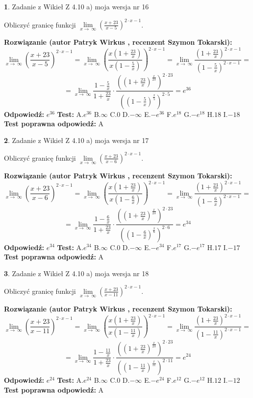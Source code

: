 \documentclass[12pt, a4paper]{article}
\theoremstyle{definition} %
\newtheorem{zad}{}
\newcommand{\zadStart}[1]{\begin{zad}#1\newline}
\newcommand{\zadStop}{\end{zad}}
\newcommand{\rozwStart}[2]{\noindent \textbf{Rozwiązanie (autor #1 , recenzent #2): }\newline}
\newcommand{\rozwStop}{\newline}
\newcommand{\odpStart}{\noindent \textbf{Odpowiedź:}\newline}
\newcommand{\odpStop}{\newline}
\newcommand{\testStart}{\noindent \textbf{Test:}\newline}
\newcommand{\testStop}{\newline}
\newcommand{\kluczStart}{\noindent \textbf{Test poprawna odpowiedź:}\newline}
\newcommand{\kluczStop}{\newline}
\begin{document}
\zadStart{Zadanie z Wikieł Z 4.10 a) moja wersja nr 16}

Obliczyć granicę funkcji  $\lim\limits_{x\to\ \infty}(\frac{x+23}{x-5})^{2\cdot x-1}$.
\zadStop
\rozwStart{Patryk Wirkus}{Szymon Tokarski}
$$\lim\limits_{x\to\ \infty}(\frac{x+23}{x-5})^{2\cdot x-1} = \lim\limits_{x\to\ \infty}(\frac{x(1+\frac{23}{x})}{x(1-\frac{5}{x})})^{2\cdot x-1}=\lim\limits_{x\to\ \infty}\frac{(1+\frac{23}{x})^{2\cdot x-1}}{(1-\frac{5}{x})^{2\cdot x-1}}=$$
$$=\lim\limits_{x\to\ \infty}\frac{1-\frac{5}{x}}{1+\frac{23}{x}}\cdot\frac{((1+\frac{23}{x})^{\frac{x}{23}})^{2\cdot23}}{((1-\frac{5}{x})^{\frac{x}{5}})^{2\cdot5}}=e^{36}$$
\rozwStop
\odpStart
$e^{36}$
\odpStop
\testStart
A.$e^{36}$ B.$\infty$ C.$0$ D.$-\infty$ E.$-e^{36}$
F.$e^{18}$ G.$-e^{18}$
H.$18$
I.$-18$
\testStop
\kluczStart
A
\kluczStop



\zadStart{Zadanie z Wikieł Z 4.10 a) moja wersja nr 17}

Obliczyć granicę funkcji  $\lim\limits_{x\to\ \infty}(\frac{x+23}{x-6})^{2\cdot x-1}$.
\zadStop
\rozwStart{Patryk Wirkus}{Szymon Tokarski}
$$\lim\limits_{x\to\ \infty}(\frac{x+23}{x-6})^{2\cdot x-1} = \lim\limits_{x\to\ \infty}(\frac{x(1+\frac{23}{x})}{x(1-\frac{6}{x})})^{2\cdot x-1}=\lim\limits_{x\to\ \infty}\frac{(1+\frac{23}{x})^{2\cdot x-1}}{(1-\frac{6}{x})^{2\cdot x-1}}=$$
$$=\lim\limits_{x\to\ \infty}\frac{1-\frac{6}{x}}{1+\frac{23}{x}}\cdot\frac{((1+\frac{23}{x})^{\frac{x}{23}})^{2\cdot23}}{((1-\frac{6}{x})^{\frac{x}{6}})^{2\cdot6}}=e^{34}$$
\rozwStop
\odpStart
$e^{34}$
\odpStop
\testStart
A.$e^{34}$ B.$\infty$ C.$0$ D.$-\infty$ E.$-e^{34}$
F.$e^{17}$ G.$-e^{17}$
H.$17$
I.$-17$
\testStop
\kluczStart
A
\kluczStop



\zadStart{Zadanie z Wikieł Z 4.10 a) moja wersja nr 18}

Obliczyć granicę funkcji  $\lim\limits_{x\to\ \infty}(\frac{x+23}{x-11})^{2\cdot x-1}$.
\zadStop
\rozwStart{Patryk Wirkus}{Szymon Tokarski}
$$\lim\limits_{x\to\ \infty}(\frac{x+23}{x-11})^{2\cdot x-1} = \lim\limits_{x\to\ \infty}(\frac{x(1+\frac{23}{x})}{x(1-\frac{11}{x})})^{2\cdot x-1}=\lim\limits_{x\to\ \infty}\frac{(1+\frac{23}{x})^{2\cdot x-1}}{(1-\frac{11}{x})^{2\cdot x-1}}=$$
$$=\lim\limits_{x\to\ \infty}\frac{1-\frac{11}{x}}{1+\frac{23}{x}}\cdot\frac{((1+\frac{23}{x})^{\frac{x}{23}})^{2\cdot23}}{((1-\frac{11}{x})^{\frac{x}{11}})^{2\cdot11}}=e^{24}$$
\rozwStop
\odpStart
$e^{24}$
\odpStop
\testStart
A.$e^{24}$ B.$\infty$ C.$0$ D.$-\infty$ E.$-e^{24}$
F.$e^{12}$ G.$-e^{12}$
H.$12$
I.$-12$
\testStop
\kluczStart
A
\kluczStop
\end{document}
